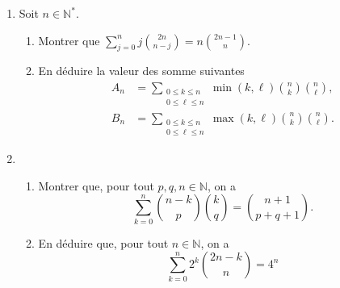 \documentclass[7pt, twocolumn]{extarticle}
\def\N{\mathbb N}
\begin{document}
\begin{enumerate}[start=11,label={\bfseries \arabic*}]
\begin{enumerate}[start=1, label={\bfseries \arabic*.}]
		\end{enumerate}
		\item Soit $n\in\N^*$.
		\begin{enumerate}[start=1, label={\bfseries \arabic*.}]
			\item Montrer que \(\sum_{j=0}^nj\binom{2n}{n-j}=n\binom{2n-1}n\).
			\item En déduire la valeur des somme suivantes
			\begin{align*}
				A_n &=\sum_{\begin{smallmatrix}0\leq k\leq n\\ 0\leq \ell \leq n\end{smallmatrix}}\min(k,\ell)\binom nk\binom n\ell,\\
				B_n &=\sum_{\begin{smallmatrix}0\leq k\leq n\\ 0\leq \ell \leq n\end{smallmatrix}}\max(k,\ell)\binom nk\binom n\ell.
			\end{align*}
		\end{enumerate}
		\item 
		\begin{enumerate}[start=1, label={\bfseries \arabic*.}]
			\item Montrer que, pour tout $p,q,n\in\N$, on a \[\sum_{k=0}^n\binom{n-k}p\binom kq=\binom{n+1}{p+q+1}.\]
			\item En déduire que, pour tout $n\in\N$, on a \[\sum_{k=0}^n2^k\binom{2n-k}n=4^n\]
		\end{enumerate}
	\end{enumerate}
\end{document}
